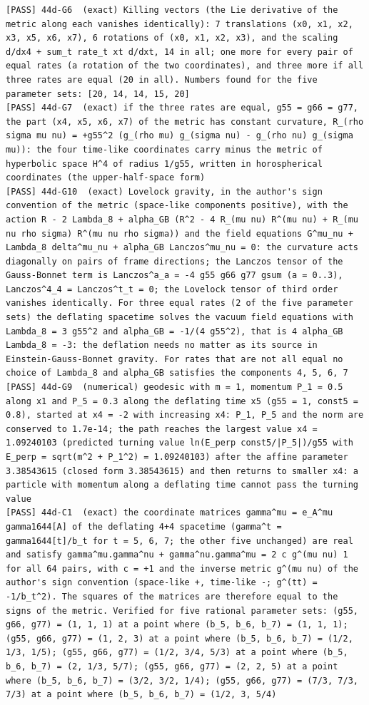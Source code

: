 \documentclass[
  10pt,
]{article}
\begin{document}
\begin{verbatim}
[PASS] 44d-G6  (exact) Killing vectors (the Lie derivative of the metric along each vanishes identically): 7 translations (x0, x1, x2, x3, x5, x6, x7), 6 rotations of (x0, x1, x2, x3), and the scaling d/dx4 + sum_t rate_t xt d/dxt, 14 in all; one more for every pair of equal rates (a rotation of the two coordinates), and three more if all three rates are equal (20 in all). Numbers found for the five parameter sets: [20, 14, 14, 15, 20]
[PASS] 44d-G7  (exact) if the three rates are equal, g55 = g66 = g77, the part (x4, x5, x6, x7) of the metric has constant curvature, R_(rho sigma mu nu) = +g55^2 (g_(rho mu) g_(sigma nu) - g_(rho nu) g_(sigma mu)): the four time-like coordinates carry minus the metric of hyperbolic space H^4 of radius 1/g55, written in horospherical coordinates (the upper-half-space form)
[PASS] 44d-G10  (exact) Lovelock gravity, in the author's sign convention of the metric (space-like components positive), with the action R - 2 Lambda_8 + alpha_GB (R^2 - 4 R_(mu nu) R^(mu nu) + R_(mu nu rho sigma) R^(mu nu rho sigma)) and the field equations G^mu_nu + Lambda_8 delta^mu_nu + alpha_GB Lanczos^mu_nu = 0: the curvature acts diagonally on pairs of frame directions; the Lanczos tensor of the Gauss-Bonnet term is Lanczos^a_a = -4 g55 g66 g77 gsum (a = 0..3), Lanczos^4_4 = Lanczos^t_t = 0; the Lovelock tensor of third order vanishes identically. For three equal rates (2 of the five parameter sets) the deflating spacetime solves the vacuum field equations with Lambda_8 = 3 g55^2 and alpha_GB = -1/(4 g55^2), that is 4 alpha_GB Lambda_8 = -3: the deflation needs no matter as its source in Einstein-Gauss-Bonnet gravity. For rates that are not all equal no choice of Lambda_8 and alpha_GB satisfies the components 4, 5, 6, 7
[PASS] 44d-G9  (numerical) geodesic with m = 1, momentum P_1 = 0.5 along x1 and P_5 = 0.3 along the deflating time x5 (g55 = 1, const5 = 0.8), started at x4 = -2 with increasing x4: P_1, P_5 and the norm are conserved to 1.7e-14; the path reaches the largest value x4 = 1.09240103 (predicted turning value ln(E_perp const5/|P_5|)/g55 with E_perp = sqrt(m^2 + P_1^2) = 1.09240103) after the affine parameter 3.38543615 (closed form 3.38543615) and then returns to smaller x4: a particle with momentum along a deflating time cannot pass the turning value
[PASS] 44d-C1  (exact) the coordinate matrices gamma^mu = e_A^mu gamma1644[A] of the deflating 4+4 spacetime (gamma^t = gamma1644[t]/b_t for t = 5, 6, 7; the other five unchanged) are real and satisfy gamma^mu.gamma^nu + gamma^nu.gamma^mu = 2 c g^(mu nu) 1 for all 64 pairs, with c = +1 and the inverse metric g^(mu nu) of the author's sign convention (space-like +, time-like -; g^(tt) = -1/b_t^2). The squares of the matrices are therefore equal to the signs of the metric. Verified for five rational parameter sets: (g55, g66, g77) = (1, 1, 1) at a point where (b_5, b_6, b_7) = (1, 1, 1); (g55, g66, g77) = (1, 2, 3) at a point where (b_5, b_6, b_7) = (1/2, 1/3, 1/5); (g55, g66, g77) = (1/2, 3/4, 5/3) at a point where (b_5, b_6, b_7) = (2, 1/3, 5/7); (g55, g66, g77) = (2, 2, 5) at a point where (b_5, b_6, b_7) = (3/2, 3/2, 1/4); (g55, g66, g77) = (7/3, 7/3, 7/3) at a point where (b_5, b_6, b_7) = (1/2, 3, 5/4)

\end{verbatim}
\end{document}
